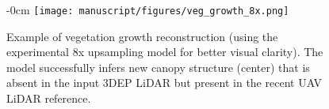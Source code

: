 \documentclass[remotesensing,article,submit,pdftex,moreauthors]{Definitions/mdpi}
\newenvironment{widefigure}[1][]{%
  \begin{figure}[#1]\begin{adjustwidth}{-\extralength}{0cm}\centering}{%
  \end{adjustwidth}\end{figure}}
\begin{document}



% 



\clearpage
{} %
\appendixstart
\appendix
\begin{widefigure}[H]
    \centering
    \texttt{[image: manuscript/figures/veg\_growth\_8x.png]}
    \caption{Example of vegetation growth reconstruction (using the experimental 8x upsampling model for better visual clarity). The model successfully infers new canopy structure (center) that is absent in the input 3DEP LiDAR but present in the recent UAV LiDAR reference.}
    \label{fig:appendix_growth1}
\end{widefigure}
\end{document}
